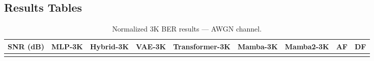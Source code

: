 \documentclass[
  english,
  12pt,
  12pt,
  a4paper,
  oneside]{report}
\begin{document}
\subsection{Results Tables}\label{sec:results-tables-2}

\begin{longtable}[]{@{}
  >{\raggedright\arraybackslash}p{}
  >{\raggedright\arraybackslash}p{}
  >{\raggedright\arraybackslash}p{}
  >{\raggedright\arraybackslash}p{}
  >{\raggedright\arraybackslash}p{}
  >{\raggedright\arraybackslash}p{}
  >{\raggedright\arraybackslash}p{}
  >{\raggedright\arraybackslash}p{}
  >{\raggedright\arraybackslash}p{}@{}}
\caption{Normalized 3K BER results --- AWGN channel.}\label{tbl:table7}\tabularnewline
\toprule\noalign{}
\begin{minipage}[b]{\linewidth}\raggedright
SNR (dB)
\end{minipage} & \begin{minipage}[b]{\linewidth}\raggedright
MLP-3K
\end{minipage} & \begin{minipage}[b]{\linewidth}\raggedright
Hybrid-3K
\end{minipage} & \begin{minipage}[b]{\linewidth}\raggedright
VAE-3K
\end{minipage} & \begin{minipage}[b]{\linewidth}\raggedright
Transformer-3K
\end{minipage} & \begin{minipage}[b]{\linewidth}\raggedright
Mamba-3K
\end{minipage} & \begin{minipage}[b]{\linewidth}\raggedright
Mamba2-3K
\end{minipage} & \begin{minipage}[b]{\linewidth}\raggedright
AF
\end{minipage} & \begin{minipage}[b]{\linewidth}\raggedright
DF
\end{minipage} \\
\midrule\noalign{}
\endfirsthead
\toprule\noalign{}
\begin{minipage}[b]{\linewidth}\raggedright

\end{minipage}
\end{longtable}
\end{document}
